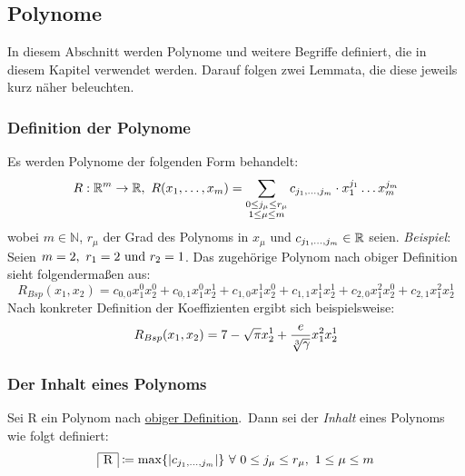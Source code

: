 
\subsection{Polynome}
    \label{subsec:polynomials}
    \textrm{In diesem Abschnitt werden Polynome und weitere Begriffe definiert, die in diesem Kapitel verwendet werden.
    Darauf folgen zwei Lemmata, die diese jeweils kurz näher beleuchten.}
    
    \subsubsection{Definition der Polynome}
        \label{subsubsec:def-poly}
        Es werden Polynome der folgenden Form behandelt:
        \begin{equation}
            R : \mathbb{R}^m \rightarrow \mathbb{R},\
            R(x_1, \dots, x_m) = \sum_{\substack{0 \leq j_\mu \leq r_\mu \\ 1 \leq \mu \leq m}}
            c_{j_1, \dots, j_m} \cdot x_1^{j_1} \dots x_m^{j_m} \label{eq:def-poly}
        \end{equation}
        wobei $m \in \mathbb{N}$, $r_\mu$ der Grad des Polynoms in $x_\mu$ und $c_{j_1, \dots, j_m} \in \mathbb{R}$ seien.
        \newpage
        \emph{Beispiel}: Seien $m = 2,\ r_1 = 2 \ \textrm{und}\  r_2 = 1$.
        \newline
        \textrm{Das zugehörige Polynom nach obiger Definition sieht folgendermaßen aus:}
        \begin{equation*}
            R_{Bsp}(x_1, x_2) = c_{0,0} x_1^0 x_2^0 + c_{0,1} x_1^0 x_2^1 + c_{1,0} x_1^1 x_2^0 + c_{1,1} x_1^1 x_2^1 +
            c_{2, 0} x_1^2 x_2^0 + c_{2,1} x_1^2 x_2^1
        \end{equation*}
        Nach konkreter Definition der Koeffizienten ergibt sich beispielsweise:
        \begin{equation*}
            R_{Bsp}(x_1, x_2) = 7 - \sqrt{\pi} x_2^1 + \frac{e}{\sqrt[3]{\gamma}} x_1^2 x_2^1
        \end{equation*}
    
    \subsubsection{Der Inhalt eines Polynoms}
        \label{subsubsec:def-content}
        Sei R ein Polynom nach \hyperref[subsubsec:def-poly]{obiger Definition}.\ Dann sei der \emph{Inhalt} eines
        Polynoms wie folgt definiert:
        \begin{equation}
            \content{R} \coloneq \max\{|c_{\enum{j_1}{j_m}}| \} \  \forall \  0 \leq j_\mu \leq r_\mu, \
            1 \leq \mu \leq m \label{eq:def-content}
        \end{equation}
    
